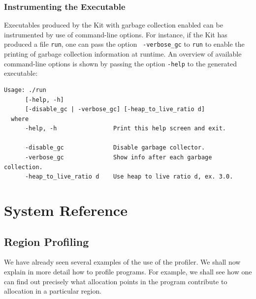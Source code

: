 \documentclass[12pt]{book}
\begin{document}
\section{Instrumenting the Executable}
Executables produced by the Kit with garbage collection enabled can be
instrumented by use of command-line options. For instance, if the Kit
has produced a file {\tt run}, one can pass the option {\tt
  -verbose\_gc} to {\tt run} to enable the printing of garbage
collection information at runtime. An overview of available
command-line options is shown by passing the option {\tt -help} to the
generated executable: {\small
\begin{verbatim}
Usage: ./run
      [-help, -h] 
      [-disable_gc | -verbose_gc] [-heap_to_live_ratio d] 
  where
      -help, -h                Print this help screen and exit.

      -disable_gc              Disable garbage collector.
      -verbose_gc              Show info after each garbage collection.
      -heap_to_live_ratio d    Use heap to live ratio d, ex. 3.0.
\end{verbatim}
}

\part{System Reference}

\chapter{Region Profiling}
\label{useOfProf.sec}
We have already seen several examples of the use of the profiler. We
shall now explain in more detail how to profile programs. For example, we shall see
how one can find out precisely what allocation points in the program
contribute to allocation in a particular region.
\end{document}
